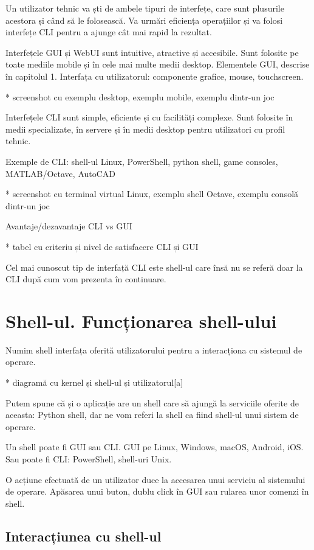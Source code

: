 Un utilizator tehnic va ști de ambele tipuri de interfețe, care sunt plusurile
acestora și când să le folosească. Va urmări eficiența operațiilor și va folosi
interfețe CLI pentru a ajunge cât mai rapid la rezultat.

Interfețele GUI și WebUI sunt intuitive, atractive și accesibile. Sunt folosite
pe toate mediile mobile și în cele mai multe medii desktop. Elementele GUI,
descrise în capitolul 1. Interfața cu utilizatorul: componente grafice, mouse,
touchscreen.

* screenshot cu exemplu desktop, exemplu mobile, exemplu dintr-un joc

Interfețele CLI sunt simple, eficiente și cu facilități complexe. Sunt folosite
în medii specializate, în servere și în medii desktop pentru utilizatori cu
profil tehnic.

Exemple de CLI: shell-ul Linux, PowerShell, python shell, game consoles,
MATLAB/Octave, AutoCAD

* screenshot cu terminal virtual Linux, exemplu shell Octave, exemplu consolă dintr-un joc

Avantaje/dezavantaje CLI vs GUI

* tabel cu criteriu și nivel de satisfacere CLI și GUI

Cel mai cunoscut tip de interfață CLI este shell-ul care însă nu se referă doar la CLI după cum vom prezenta în continuare.

\section{Shell-ul. Funcționarea shell-ului}
\label{sec:cli-shell}

Numim shell interfața oferită utilizatorului pentru a interacționa cu sistemul
de operare.

* diagramă cu kernel și shell-ul și utilizatorul[a]

Putem spune că și o aplicație are un shell care să ajungă la serviciile oferite
de aceasta: Python shell, dar ne vom referi la shell ca fiind shell-ul unui
sistem de operare.

Un shell poate fi GUI sau CLI. GUI pe Linux, Windows, macOS, Android, iOS. Sau
poate fi CLI: PowerShell, shell-uri Unix.

O acțiune efectuată de un utilizator duce la accesarea unui serviciu al
sistemului de operare. Apăsarea unui buton, dublu click în GUI sau rularea unor
comenzi în shell.

\subsection{Interacțiunea cu shell-ul}
\label{sec:cli-shell-interact}

